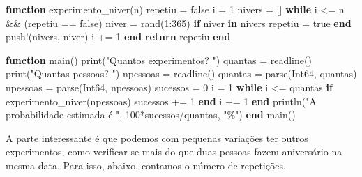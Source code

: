 \documentclass[
  letterpaper,
  DIV=11,
  numbers=noendperiod]{scrreprt}
\newenvironment{Shaded}{\begin{snugshade}}{\end{snugshade}}
\newcommand{\ConstantTok}[1]{\textcolor[rgb]{0.56,0.35,0.01}{#1}}
\newcommand{\ControlFlowTok}[1]{\textcolor[rgb]{0.00,0.23,0.31}{\textbf{#1}}}
\newcommand{\DataTypeTok}[1]{\textcolor[rgb]{0.68,0.00,0.00}{#1}}
\newcommand{\FloatTok}[1]{\textcolor[rgb]{0.68,0.00,0.00}{#1}}
\newcommand{\FunctionTok}[1]{\textcolor[rgb]{0.28,0.35,0.67}{#1}}
\newcommand{\KeywordTok}[1]{\textcolor[rgb]{0.00,0.23,0.31}{\textbf{#1}}}
\newcommand{\NormalTok}[1]{\textcolor[rgb]{0.00,0.23,0.31}{#1}}
\newcommand{\OperatorTok}[1]{\textcolor[rgb]{0.37,0.37,0.37}{#1}}
\newcommand{\StringTok}[1]{\textcolor[rgb]{0.13,0.47,0.30}{#1}}
\begin{document}
\begin{Shaded}
\begin{Highlighting}[]
\KeywordTok{function} \FunctionTok{experimento\_niver}\NormalTok{(n)}
\NormalTok{    repetiu }\OperatorTok{=} \ConstantTok{false}
\NormalTok{    i }\OperatorTok{=} \FloatTok{1}
\NormalTok{    nivers }\OperatorTok{=}\NormalTok{ []}
    \ControlFlowTok{while}\NormalTok{ i }\OperatorTok{\textless{}=}\NormalTok{ n }\OperatorTok{\&\&}\NormalTok{ (repetiu }\OperatorTok{==} \ConstantTok{false}\NormalTok{)}
\NormalTok{        niver }\OperatorTok{=} \FunctionTok{rand}\NormalTok{(}\FloatTok{1}\OperatorTok{:}\FloatTok{365}\NormalTok{)}
        \ControlFlowTok{if}\NormalTok{ niver }\KeywordTok{in}\NormalTok{ nivers}
\NormalTok{            repetiu }\OperatorTok{=} \ConstantTok{true}
        \ControlFlowTok{end}
        \FunctionTok{push!}\NormalTok{(nivers, niver)}
\NormalTok{        i }\OperatorTok{+=} \FloatTok{1}
    \ControlFlowTok{end}
    \ControlFlowTok{return}\NormalTok{ repetiu}
\KeywordTok{end}

\KeywordTok{function} \FunctionTok{main}\NormalTok{()}
    \FunctionTok{print}\NormalTok{(}\StringTok{"Quantos experimentos? "}\NormalTok{)}
\NormalTok{    quantas }\OperatorTok{=} \FunctionTok{readline}\NormalTok{()}
    \FunctionTok{print}\NormalTok{(}\StringTok{"Quantas pessoas? "}\NormalTok{)}
\NormalTok{    npessoas }\OperatorTok{=} \FunctionTok{readline}\NormalTok{()}
\NormalTok{    quantas }\OperatorTok{=} \FunctionTok{parse}\NormalTok{(}\DataTypeTok{Int64}\NormalTok{, quantas)}
\NormalTok{    npessoas }\OperatorTok{=} \FunctionTok{parse}\NormalTok{(}\DataTypeTok{Int64}\NormalTok{, npessoas)}
\NormalTok{    sucessos }\OperatorTok{=} \FloatTok{0}
\NormalTok{    i }\OperatorTok{=} \FloatTok{1}
    \ControlFlowTok{while}\NormalTok{ i }\OperatorTok{\textless{}=}\NormalTok{ quantas}
        \ControlFlowTok{if} \FunctionTok{experimento\_niver}\NormalTok{(npessoas)}
\NormalTok{            sucessos }\OperatorTok{+=} \FloatTok{1}
        \ControlFlowTok{end}
\NormalTok{        i }\OperatorTok{+=} \FloatTok{1}
    \ControlFlowTok{end}
    \FunctionTok{println}\NormalTok{(}\StringTok{"A probabilidade estimada é "}\NormalTok{, }\FloatTok{100}\OperatorTok{*}\NormalTok{sucessos}\OperatorTok{/}\NormalTok{quantas, }\StringTok{"\%"}\NormalTok{)}
\KeywordTok{end}
\FunctionTok{main}\NormalTok{()}
\end{Highlighting}
\end{Shaded}

A parte interessante é que podemos com pequenas variações ter outros
experimentos, como verificar se mais do que duas pessoas fazem
aniversário na mesma data. Para isso, abaixo, contamos o número de
repetições.
\end{document}
